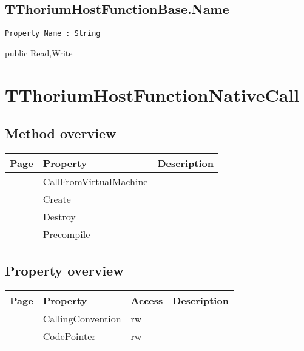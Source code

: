 \subsection{TThoriumHostFunctionBase.Name}
\label{thoriumcore:thorium:tthoriumhostfunctionbase:name}
\begin{FPCList}
\Synopsis
\Declaration 

\begin{verbatim}
Property Name : String
\end{verbatim}
\Visibility
public
\Access
Read,Write
\Description
\end{FPCList}
\section{TThoriumHostFunctionNativeCall}
\label{thoriumcore:thorium:tthoriumhostfunctionnativecall}
\subsection{Method overview}
\label{thoriumcore:thorium:tthoriumhostfunctionnativecall:methods}
\begin{tabularx}{\textwidth}{llX}
Page & Property & Description  \\ \hline
\pageref{thoriumcore:thorium:tthoriumhostfunctionnativecall:callfromvirtualmachine} & CallFromVirtualMachine  &  \\
\pageref{thoriumcore:thorium:tthoriumhostfunctionnativecall:create} & Create  &  \\
\pageref{thoriumcore:thorium:tthoriumhostfunctionnativecall:destroy} & Destroy  &  \\
\pageref{thoriumcore:thorium:tthoriumhostfunctionnativecall:precompile} & Precompile  &  \\
\hline
\end{tabularx}
\subsection{Property overview}
\label{thoriumcore:thorium:tthoriumhostfunctionnativecall:properties}
\begin{tabularx}{\textwidth}{lllX}
Page & Property & Access & Description \\ \hline
\pageref{thoriumcore:thorium:tthoriumhostfunctionnativecall:callingconvention} & CallingConvention & rw &  \\
\pageref{thoriumcore:thorium:tthoriumhostfunctionnativecall:codepointer} & CodePointer & rw &  \\
\hline
\end{tabularx}
